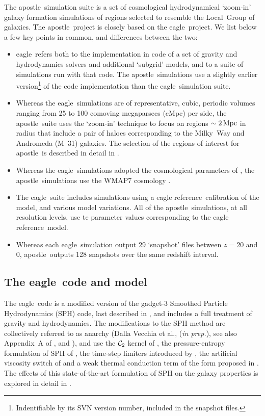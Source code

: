 \documentclass[10pt, a4paper]{article}
\newcommand{\eagle}{{\sc eagle}}
\newcommand{\apostle}{{\sc apostle}}
\newcommand{\REF}{{\sc eagle reference}}
\newcommand{\gadget}{{\sc gadget}}
\begin{document}
The \apostle\ simulation suite \citep{2016MNRAS.457.1931S,2016MNRAS.457..844F} is a set of cosmological hydrodynamical `zoom-in' galaxy formation simulations of regions selected to resemble the Local~Group of galaxies. The \apostle\ project is closely based on the \eagle\ project. We list below a few key points in common, and differences between the two:
\begin{itemize}
\item \eagle\ refers both to the implementation in code of a set of gravity and hydrodynamics solvers and additional `subgrid' models, and to a suite of simulations run with that code. The \apostle\ simulations use a slightly earlier version\footnote{Indentifiable by its SVN version number, included in the snapshot files.} of the code implementation than the \eagle\ simulation suite.
\item Whereas the \eagle\ simulations are of representative, cubic, periodic volumes ranging from 25 to 100 comoving megaparsecs (cMpc) per side, the \apostle\ suite uses the `zoom-in' technique \citep{2003MNRAS.338...14P,2013MNRAS.434.2094J} to focus on regions $\sim 2\,{\rm Mpc}$ in radius that include a pair of haloes corresponding to the Milky~Way and Andromeda (M~31) galaxies. The selection of the regions of interest for \apostle\ is described in detail in \citet{2016MNRAS.457..844F}.
\item Whereas the \eagle\ simulations adopted the cosmological parameters of \citet{2014AnA...571A..16P}, the \apostle\ simulations use the WMAP7 cosmology \citet{2011ApJS..192...18K}.
\item The \eagle\ suite includes simulations using a \REF\ calibration of the model, and various model variations. All of the \apostle\ simulations, at all resolution levels, use te parameter values corresponding to the \REF\ model.
\item Whereas each \eagle\ simulation output 29 `snapshot' files between $z=20$ and $0$, \apostle\ outputs 128 snapshots over the same redshift interval.
\end{itemize}

\subsection{The \eagle\ code and model}

The \eagle\ code is a modified version of the \gadget-3 Smoothed Particle Hydrodynamics (SPH) code, last described in \cite{2005MNRAS.364.1105S}, and includes a full treatment of gravity and hydrodynamics. The modifications to the SPH method are collectively referred to as {\sc anarchy} (Dalla Vecchia et al., (\textit{in prep.}), see also Appendix~A of \cite{2015MNRAS.446..521S}, and \cite{2015MNRAS.454.2277S}), and use the ${\cal C}_2$ kernel of \cite{Wendland1995}, the pressure-entropy formulation of SPH of \cite{2013MNRAS.428.2840H}, the time-step limiters introduced by \cite{2012MNRAS.419..465D}, the artificial viscosity switch of \cite{2010MNRAS.408..669C} and a weak thermal conduction term of the form proposed in \cite{2008JCoPh.22710040P}. The effects of this state-of-the-art formulation of SPH on the galaxy properties is explored in detail in \cite{2015MNRAS.454.2277S}.
\end{document}
